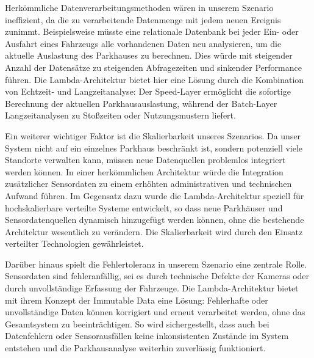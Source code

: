 Herkömmliche Datenverarbeitungsmethoden wären in unserem Szenario ineffizient, da die zu verarbeitende Datenmenge mit jedem neuen Ereignis zunimmt. Beispielsweise müsste eine relationale Datenbank bei jeder Ein- oder Ausfahrt eines Fahrzeugs alle vorhandenen Daten neu analysieren, um die aktuelle Auslastung des Parkhauses zu berechnen. Dies würde mit steigender Anzahl der Datensätze zu steigenden Abfragezeiten und sinkender Performance führen. Die Lambda-Architektur bietet hier eine Lösung durch die Kombination von Echtzeit- und Langzeitanalyse: Der Speed-Layer ermöglicht die sofortige Berechnung der aktuellen Parkhausauslastung, während der Batch-Layer Langzeitanalysen zu Stoßzeiten oder Nutzungsmustern liefert.

Ein weiterer wichtiger Faktor ist die Skalierbarkeit unseres Szenarios. Da unser System nicht auf ein einzelnes Parkhaus beschränkt ist, sondern potenziell viele Standorte verwalten kann, müssen neue Datenquellen problemlos integriert werden können. In einer herkömmlichen Architektur würde die Integration zusätzlicher Sensordaten zu einem erhöhten administrativen und technischen Aufwand führen. Im Gegensatz dazu wurde die Lambda-Architektur speziell für hochskalierbare verteilte Systeme entwickelt, so dass neue Parkhäuser und Sensordatenquellen dynamisch hinzugefügt werden können, ohne die bestehende Architektur wesentlich zu verändern. Die Skalierbarkeit wird durch den Einsatz verteilter Technologien gewährleistet.

Darüber hinaus spielt die Fehlertoleranz in unserem Szenario eine zentrale Rolle. Sensordaten sind fehleranfällig, sei es durch technische Defekte der Kameras oder durch unvollständige Erfassung der Fahrzeuge. Die Lambda-Architektur bietet mit ihrem Konzept der Immutable Data eine Lösung: Fehlerhafte oder unvollständige Daten können korrigiert und erneut verarbeitet werden, ohne das Gesamtsystem zu beeinträchtigen. So wird sichergestellt, dass auch bei Datenfehlern oder Sensorausfällen keine inkonsistenten Zustände im System entstehen und die Parkhausanalyse weiterhin zuverlässig funktioniert.
